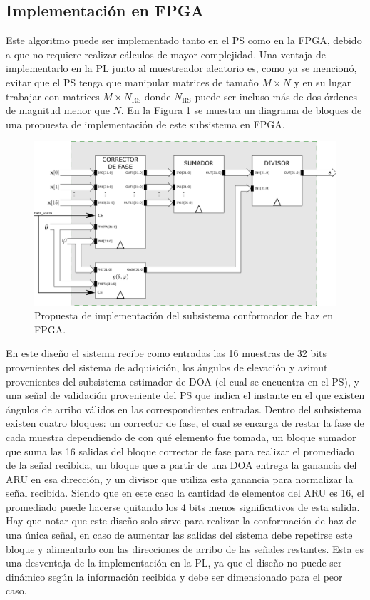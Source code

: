 \subsection{Implementación en FPGA}

Este algoritmo puede ser implementado tanto en el PS como en la FPGA, debido a que no requiere realizar cálculos de mayor complejidad. Una ventaja de implementarlo en la PL junto al muestreador aleatorio es, como ya se mencionó, evitar que el PS tenga que manipular matrices de tamaño $M\times N$ y en su lugar trabajar con matrices $M\times N_{\textrm{RS}}$ donde $N_{\textrm{RS}}$ puede ser incluso más de dos órdenes de magnitud menor que $N$. En la Figura \ref{fig:sistema_beamformer_fpga} se muestra un diagrama de bloques de una propuesta de implementación de este subsistema en FPGA.

\begin{figure}[ht!]
    \centering
    \includegraphics[width=0.9\linewidth]{images/06-Sistema/sistema_beamformer_fpga.png}
    \caption{Propuesta de implementación del subsistema conformador de haz en FPGA.}
    \label{fig:sistema_beamformer_fpga}
\end{figure}

En este diseño el sistema recibe como entradas las 16 muestras de 32 bits provenientes del sistema de adquisición, los ángulos de elevación y azimut provenientes del subsistema estimador de DOA (el cual se encuentra en el PS), y una señal de validación proveniente del PS que indica el instante en el que existen ángulos de arribo válidos en las correspondientes entradas. Dentro del subsistema existen cuatro bloques: un corrector de fase, el cual se encarga de restar la fase de cada muestra dependiendo de con qué elemento fue tomada, un bloque sumador que suma las 16 salidas del bloque corrector de fase para realizar el promediado de la señal recibida, un bloque que a partir de una DOA entrega la ganancia del ARU en esa dirección, y un divisor que utiliza esta ganancia para normalizar la señal recibida. Siendo que en este caso la cantidad de elementos del ARU es 16, el promediado puede hacerse quitando los 4 bits menos significativos de esta salida. Hay que notar que este diseño solo sirve para realizar la conformación de haz de una única señal, en caso de aumentar las salidas del sistema debe repetirse este bloque y alimentarlo con las direcciones de arribo de las señales restantes. Esta es una desventaja de la implementación en la PL, ya que el diseño no puede ser dinámico según la información recibida y debe ser dimensionado para el peor caso.